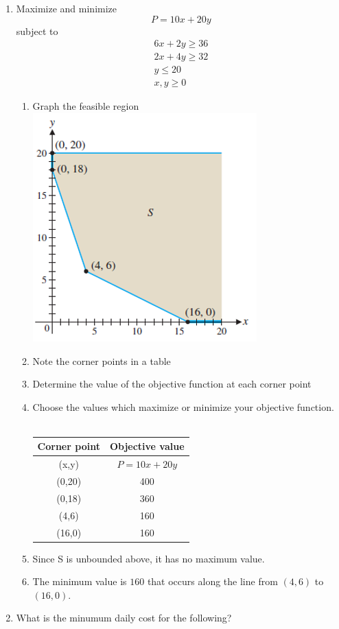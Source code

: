 \documentclass[14pt]{extarticle}
\begin{document}
\begin{enumerate}
\item  Maximize and minimize
$$P = 10x +20y$$
subject to 
\begin{align*}
	6x+2y \geq 36 \\
	2x+4y \geq 32 \\
	y \leq 20 \\
	x,y \geq 0
\end{align*}
\begin{enumerate}
	\item Graph the feasible region\\
	\includegraphics[width=0.6\linewidth]{5-3-10}
	\item Note the corner points in a table
	\item Determine the value of the objective function at each corner point
	\item Choose the values which maximize or minimize your objective function.	\\\\
	\begin{tabular}{|c|c|}
		\hline
		Corner point & Objective value \\
		\hline
		(x,y) & $P=10x+20y$ \\
		\hline
		(0,20) & 400 \\
		\hline
		(0,18) & 360 \\
		\hline
		(4,6) & 160 \\
		\hline
		(16,0) & 160 \\
		\hline
	\end{tabular}
	\item Since S is unbounded above, it has no maximum value.
	\item The minimum value is $160$ that occurs along the line from $(4,6)$ to $(16,0)$.
\end{enumerate}

\item What is the minumum daily cost for the following?

\end{enumerate}
\end{document}
